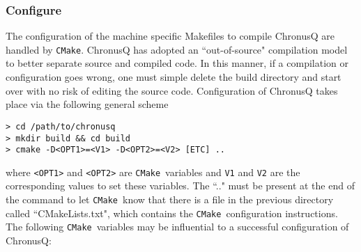 \documentclass[12pt]{article}
\newcommand{\CMake}{\texttt{CMake}}
\begin{document}
    \subsubsection{Configure} \label{subsubsec:ChronusQConfig}

    The configuration of the machine specific Makefiles to compile ChronusQ are
    handled by \CMake. ChronusQ has adopted an ``out-of-source" compilation model
    to better separate source and compiled code. In this manner, if a compilation
    or configuration goes wrong, one must simple delete the build directory and 
    start over with no risk of editing the source code. Configuration of ChronusQ
    takes place via the following general scheme
    
    \begin{lstlisting}
> cd /path/to/chronusq
> mkdir build && cd build
> cmake -D<OPT1>=<V1> -D<OPT2>=<V2> [ETC] ..
    \end{lstlisting}

    \noindent where \texttt{<OPT1>} and \texttt{<OPT2>} are \CMake~variables 
    and \texttt{V1} and \texttt{V2} are the corresponding values to set these 
    variables. The ``.." must be present at the end of the command to let 
    \CMake~know that there is a file in the previous directory called 
    ``CMakeLists.txt", which contains the \CMake~configuration instructions. The 
    following \CMake~variables may be influential to a successful configuration of 
    ChronusQ:
\end{document}

